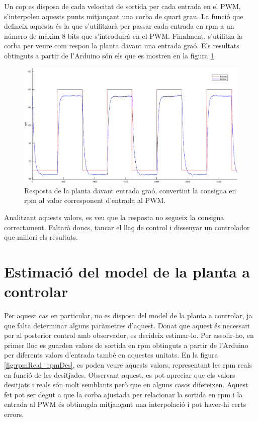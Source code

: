 \documentclass[]{article}
\begin{document}
Un cop es disposa de cada velocitat de sortida per cada entrada en el PWM, s'interpolen aquests punts mitjançant una corba de quart grau. La funció que defineix aquesta és la que s'utilitzarà per passar cada entrada en rpm a un número de màxim 8 bits que s'introduirà en el PWM. Finalment, s'utilitza la corba per veure com respon la planta davant una entrada graó. Els resultats obtinguts a partir de l'Arduino són els que es mostren en la figura \ref{fig:ent_sort_motor}.

\begin{figure}[H]
\centering
	\includegraphics[width = .8\linewidth]{images/Entrada_Sortida_Motor.eps}
	\caption{Resposta de la planta davant entrada graó, convertint la consigna en rpm al valor corresponent d'entrada al PWM.}
	\label{fig:ent_sort_motor}
\end{figure}

Analitzant aquests valors, es veu que la resposta no segueix la consigna correctament. Faltarà doncs, tancar el llaç de control i dissenyar un controlador que millori els resultats.

\section{Estimació del model de la planta a controlar}

Per aquest cas en particular, no es disposa del model de la planta a controlar, ja que falta determinar alguns paràmetres d'aquest. Donat que aquest és necessari per al posterior control amb observador, es decideix estimar-lo. Per assolir-ho, en primer lloc es guarden valors de sortida en rpm obtinguts a partir de l'Arduino per diferents valors d'entrada també en aquestes unitats. En la figura \ref{fig:rpmReal_rpmDes}, es poden veure aquests valors, representant les rpm reals en funció de les desitjades. Observant aquest, es pot apreciar que els valors desitjats i reals són molt semblants però que en alguns casos difereixen. Aquest fet pot ser degut a que la corba ajustada per relacionar la sortida en rpm i la entrada al PWM és obtinugda mitjançant una interpolació i pot haver-hi certs errors. 
\end{document}
